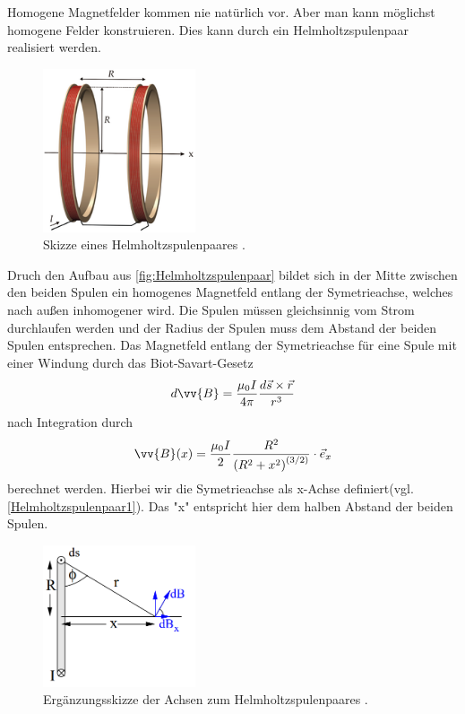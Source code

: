 Homogene Magnetfelder kommen nie natürlich vor. Aber man kann möglichst homogene Felder konstruieren. Dies kann durch ein Helmholtzspulenpaar realisiert werden.
\begin{figure}
	\centering
    \includegraphics[width=0.4\textwidth]{content/Helmholtz_coils.png}
	\caption{Skizze eines Helmholtzspulenpaares \cite{Helmholtzspulenpaar}.}
	\label{fig:Helmholtzspulenpaar}
\end{figure}
Druch den Aufbau aus \autoref{fig:Helmholtzspulenpaar} bildet sich in der Mitte zwischen den beiden Spulen ein homogenes Magnetfeld entlang der Symetrieachse, welches 
nach außen inhomogener wird. Die Spulen müssen gleichsinnig vom Strom durchlaufen werden und der Radius der Spulen muss dem Abstand der beiden Spulen entsprechen. Das Magnetfeld
entlang der Symetrieachse für eine Spule mit einer Windung durch das Biot-Savart-Gesetz
\begin{equation}
    \label{eqn:diff_Biot-Savart}
    d\vv{B} = \frac{\mu_0 I}{4\pi}\frac{d\vec{s}\times\vec{r}}{r^3}
\end{equation}
nach Integration durch
\begin{equation}
    \label{eqn:Biot-Savart_1}
    \vv{B}(x) = \frac{\mu_0 I}{2}\frac{R^2}{\left(R^2 + x^2 \right)^{(3/2)}}\cdot \vec{e}_x
\end{equation}
berechnet werden. Hierbei wir die Symetrieachse als x-Achse definiert(vgl. \autoref{Helmholtzspulenpaar1}). Das "x" entspricht hier dem halben Abstand der beiden Spulen. 
\begin{figure}
	\centering
    \includegraphics[width=0.4\textwidth]{content/Helmholtzachsen.PNG}
	\caption{Ergänzungsskizze der Achsen zum Helmholtzspulenpaares  \cite{v105}.}
	\label{fig:Helmholtzspulenpaar1}
\end{figure}
